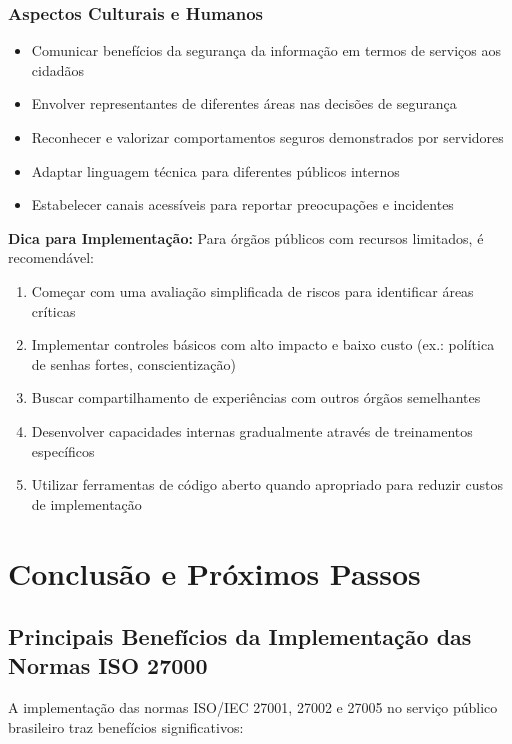 \documentclass[12pt,a4paper]{report}
\begin{document}
\subsection{Aspectos Culturais e Humanos}

\begin{itemize}
  \item Comunicar benefícios da segurança da informação em termos de serviços aos cidadãos
  \item Envolver representantes de diferentes áreas nas decisões de segurança
  \item Reconhecer e valorizar comportamentos seguros demonstrados por servidores
  \item Adaptar linguagem técnica para diferentes públicos internos
  \item Estabelecer canais acessíveis para reportar preocupações e incidentes
\end{itemize}

\begin{notebox}
\textbf{Dica para Implementação:} Para órgãos públicos com recursos limitados, é recomendável:

\begin{enumerate}
  \item Começar com uma avaliação simplificada de riscos para identificar áreas críticas
  \item Implementar controles básicos com alto impacto e baixo custo (ex.: política de senhas fortes, conscientização)
  \item Buscar compartilhamento de experiências com outros órgãos semelhantes
  \item Desenvolver capacidades internas gradualmente através de treinamentos específicos
  \item Utilizar ferramentas de código aberto quando apropriado para reduzir custos de implementação
\end{enumerate}
\end{notebox}

\chapter{Conclusão e Próximos Passos}

\section{Principais Benefícios da Implementação das Normas ISO 27000}

A implementação das normas ISO/IEC 27001, 27002 e 27005 no serviço público brasileiro traz benefícios significativos:
\end{document}
